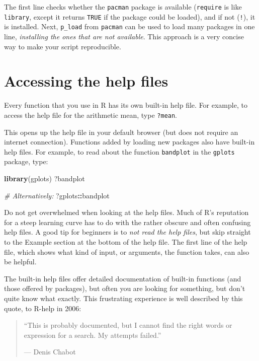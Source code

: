 \documentclass[]{book}
\newenvironment{Shaded}{\begin{snugshade}}{\end{snugshade}}
\newcommand{\CommentTok}[1]{\textcolor[rgb]{0.56,0.35,0.01}{\textit{#1}}}
\newcommand{\KeywordTok}[1]{\textcolor[rgb]{0.13,0.29,0.53}{\textbf{#1}}}
\newcommand{\NormalTok}[1]{#1}
\newcommand{\OperatorTok}[1]{\textcolor[rgb]{0.81,0.36,0.00}{\textbf{#1}}}
\begin{document}
The first line checks whether the \texttt{pacman} package is available (\texttt{require} is like \texttt{library}, except it returns \texttt{TRUE} if the package could be loaded), and if not (\texttt{!}), it is installed. Next, \texttt{p\_load} from \texttt{pacman} can be used to load many packages in one line, \emph{installing the ones that are not available}. This approach is a very concise way to make your script reproducible.

\hypertarget{helpfiles}{%
\section{Accessing the help files}\label{helpfiles}}

Every function that you use in R has its own built-in help file. For example, to access the help file for the arithmetic mean, type \texttt{?mean}.

This opens up the help file in your default browser (but does not require an internet connection). Functions added by loading new packages also have built-in help files. For example, to read about the function \texttt{bandplot} in the \texttt{gplots} package, type:

\begin{Shaded}
\begin{Highlighting}[]
\KeywordTok{library}\NormalTok{(gplots)}
\NormalTok{?bandplot}

\CommentTok{# Alternatively:}
\NormalTok{?gplots}\OperatorTok{::}\NormalTok{bandplot}
\end{Highlighting}
\end{Shaded}

Do not get overwhelmed when looking at the help files. Much of R's reputation for a steep learning curve has to do with the rather obscure and often confusing help files. A good tip for beginners is to \emph{not read the help files}, but skip straight to the Example section at the bottom of the help file. The first line of the help file, which shows what kind of input, or arguments, the function takes, can also be helpful.

The built-in help files offer detailed documentation of built-in functions (and those offered by packages), but often you are looking for something, but don't quite know what exactly. This frustrating experience is well described by this quote, to R-help in 2006:

\begin{quote}
``This is probably documented, but I cannot find the right words or\\
expression for a search. My attempts failed.''

--- Denis Chabot
\end{quote}
\end{document}

